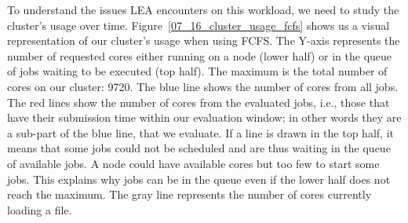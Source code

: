 \documentclass[conference,10pt]{IEEEtran}
\begin{document}
To understand the issues LEA encounters on this workload, we need to study the cluster's usage over time.
Figure~\ref{07_16_cluster_usage_fcfs} shows us a visual representation of 
our cluster's usage when using FCFS.
The Y-axis represents the number of requested cores either running on a
node (lower half) or in the queue of jobs waiting to be executed (top
half). The maximum is the total number of cores on our cluster: 9720.
The blue line shows the number of cores from all jobs.
The red lines show the number of cores from the evaluated jobs, i.e.,
those that have their submission time within our evaluation window; in
other words they are a sub-part of the blue line, that we evaluate.
If a line is drawn in the top half, it means that some jobs could not be scheduled
and are thus waiting in the queue of available jobs. 
A node could have available cores but too few to start some jobs.
This explains why jobs can be in the queue even if the lower half does not reach the maximum.
The gray line represents the number of cores currently loading a file.
\end{document}
